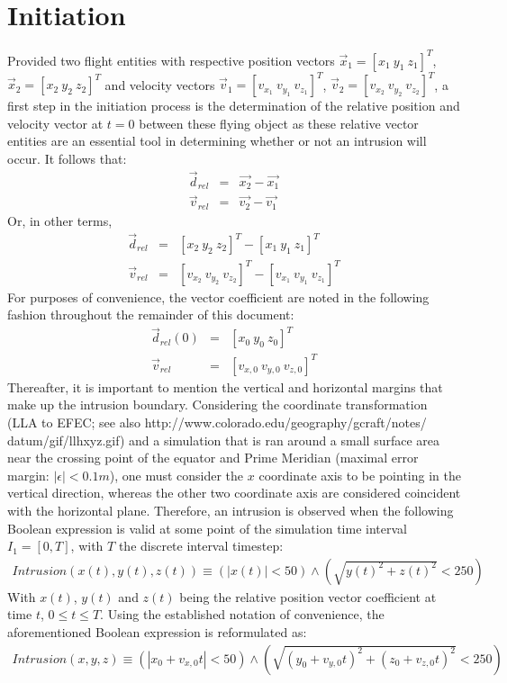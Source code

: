 \documentclass{article}
\begin{document}
\section*{Initiation}
Provided two flight entities with respective position vectors $\vec{x}_1 = [x_1 \ y_1 \ z_1]^{T}$, $\vec{x}_2 = [x_2 \ y_2 \ z_2]^{T}$ and velocity vectors $\vec{v}_1 = [v_{x_1} \ v_{y_1} \ v_{z_1}]^{T}$, $\vec{v}_2 = [v_{x_2} \ v_{y_2} \ v_{z_2}]^{T}$, a first step in the initiation process is the determination of the relative position and velocity vector at $t=0$ between these flying object as these relative vector entities are an essential tool in determining whether or not an intrusion will occur. It follows that:
\begin{eqnarray*}
\vec{d}_{rel} &=& \vec{x_2}-\vec{x_1} \\
\vec{v}_{rel} &=& \vec{v_2}-\vec{v_1}
\end{eqnarray*}
Or, in other terms,
\begin{eqnarray*}
\vec{d}_{rel} &=& [x_2 \ y_2 \ z_2]^{T}-[x_1 \ y_1 \ z_1]^{T}\\
\vec{v}_{rel} &=& [v_{x_2} \ v_{y_2} \ v_{z_2}]^{T}-[v_{x_1} \ v_{y_1} \ v_{z_1}]^{T}
\end{eqnarray*}
For purposes of convenience, the vector coefficient are noted in the following fashion throughout the remainder of this document:
\begin{eqnarray*}
\vec{d}_{rel}(0) &=& [x_0 \ y_0 \ z_0]^{T} \\
\vec{v}_{rel} &=& [v_{x,0} \ v_{y,0} \ v_{z,0}]^{T}
\end{eqnarray*}
\noindent
Thereafter, it is important to mention the vertical and horizontal margins that make up the intrusion boundary. Considering the coordinate transformation (LLA to EFEC; see also http://www.colorado.edu/geography/gcraft/notes/ datum/gif/llhxyz.gif) and a simulation that is ran around a small surface area near the crossing point of the equator and Prime Meridian (maximal error margin: $|\epsilon|<0.1m$), one must consider the $x$ coordinate axis to be pointing in the vertical direction, whereas the other two coordinate axis are considered coincident with the horizontal plane. Therefore, an intrusion is observed when the following Boolean expression is valid at some point of the simulation time interval $I_1 = [0,T]$, with $T$ the discrete interval timestep:
\begin{eqnarray*}
Intrusion(x(t),y(t),z(t)) \equiv (|x(t)|<50) \land (\sqrt{y(t)^2+z(t)^2}<250)
\end{eqnarray*}
\noindent
With $x(t)$, $y(t)$ and $z(t)$ being the relative position vector coefficient at time $t$, $0\leq t \leq T$. Using the established notation of convenience, the aforementioned Boolean expression is reformulated as:
\begin{eqnarray*}
Intrusion(x,y,z) \equiv (|x_0 +v_{x,0}t|<50) \land (\sqrt{(y_0 +v_{y,0}t)^2+(z_0 +v_{z,0}t)^2}<250)
\end{eqnarray*}
\end{document}

